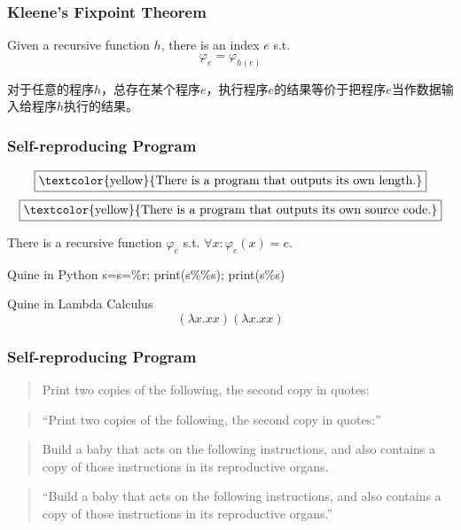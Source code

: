 \documentclass[UTF8,11pt,colorlinks,compress,openany]{beamer}%
\begin{document}
\begin{frame}\frametitle{Kleene's Fixpoint Theorem}
\setlength\abovedisplayskip{0pt}
\setlength\belowdisplayskip{0pt}
	\begin{theorem}
		Given a recursive function $h$, there is an index $e$ s.t.
		\[\varphi_e=\varphi_{h(e)}\]
	\end{theorem}
对于任意的程序$h$，总存在某个程序$e$，执行程序$e$的结果等价于把程序$e$当作数据输入给程序$h$执行的结果。
\end{frame}

\begin{frame}\frametitle{Self-reproducing Program}
	\[\fbox{\textcolor{yellow}{There is a program that outputs its own length.}}\]
	\[\fbox{\textcolor{yellow}{There is a program that outputs its own source code.}}\]
	\begin{corollary}
		There is a recursive function $\varphi_e$ s.t. $\forall x: \varphi_e(x)=e$.
	\end{corollary}
\begin{block}{Quine in Python}
s=\textquotesingle s=\%r; print(s\%\%s)\textquotesingle; print(s\%s)
\end{block}
\begin{block}{Quine in Lambda Calculus}
\[(\lambda x.xx)(\lambda x.xx)\]
\end{block}
\end{frame}

\begin{frame}\frametitle{Self-reproducing Program}
\begin{block}{}
	\begin{quote}
		Print two copies of the following, the second copy in quotes:
	\end{quote}
	\begin{quote}
		``Print two copies of the following, the second copy in quotes:''
	\end{quote}
\end{block}
	\centerline{\fbox{\textcolor{green}{DNA / mutation / evolution}}}
\begin{block}{}
	\begin{quote}
		Build a baby that acts on the following instructions, and also contains a copy of those instructions in its reproductive organs.
	\end{quote}
	\begin{quote}
		``Build a baby that acts on the following instructions, and also contains a copy of those instructions in its reproductive organs.''
	\end{quote}
\end{block}
\end{frame}
\end{document}
